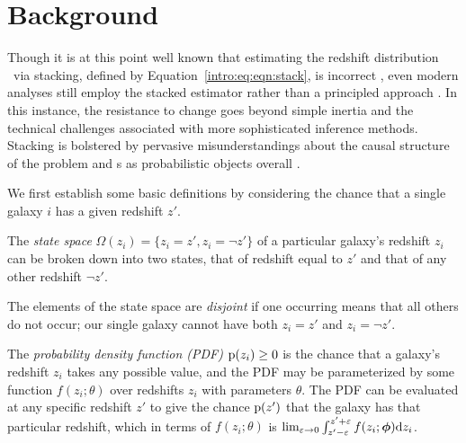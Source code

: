 \section{Background}

Though it is at this point well known that estimating the redshift distribution \Nz\ via stacking, defined by Equation~\ref{intro:eq:eqn:stack}, is incorrect \citep{leistedt_hierarchical_2016, malz_chippr_nodate}, even modern analyses still employ the stacked estimator rather than a principled approach \citep{sheldon_photometric_2012, hoyle_dark_2017}.
In this instance, the resistance to change goes beyond simple inertia and the technical challenges associated with more sophisticated inference methods.
Stacking is bolstered by pervasive misunderstandings about the causal structure of the problem and \pzpdf s as probabilistic objects overall \citep{gruen_sumzz_2017, jarvis_rmjarvis_2018, malz_aimalz_2018}.


We first establish some basic definitions by considering the chance that a single galaxy $i$ has a given redshift $z'$.

\begin{definition}\label{def:binarystatespace}
	The \textit{state space} $\Omega(z_{i}) = \{z_{i} = z', z_{i} = \lnot z'\}$ of a particular galaxy's redshift $z_{i}$ can be broken down into two states, that of redshift equal to $z'$ and that of any other redshift $\lnot z'$.
\end{definition}

\begin{definition}\label{def:disjoint}
	The elements of the state space are \textit{disjoint} if one occurring means that all others do not occur; our single galaxy cannot have both $z_{i} = z'$ and $z_{i} = \lnot z'$.
\end{definition}

\begin{definition}\label{def:pdens}
	The \textit{probability density function (PDF)} $\mathrm{p}(z_{i}) \geq 0$ is the chance that a galaxy's redshift $z_{i}$ takes any possible value, and the PDF may be parameterized by some function $f(z_{i}; \theta)$ over redshifts $z_{i}$ with parameters $\theta$.
	The PDF can be evaluated at any specific redshift $z'$ to give the chance $\mathrm{p}(z')$ that the galaxy has that particular redshift, which in terms of $f(z_{i}; \theta)$ is $\lim_{\varepsilon \to 0} \int_{z' - \varepsilon}^{z' + \varepsilon} f(z_{i}; {\boldsymbol{\phi}}) \mathrm{d}z_{i}$.
\end{definition}

